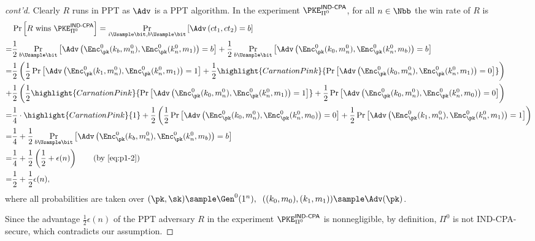 \begin{answer}
\begin{proof}[cont'd]
        Clearly $R$ runs in PPT as $\Adv$ is a PPT algorithm. In the experiment $\PKE^{\textsf{IND-CPA}}_{\Pi^0}$, for all $n\in\Nbb$ the win rate of $R$ is
        \begin{align*}
            &\Pr\left[R \textrm{ wins } \PKE^{\textsf{IND-CPA}}_{\Pi^0}\right]
            = \Pr_{i\Usample\bit, b\Usample\bit}\left[\Adv\left(ct_1, ct_2\right) = b\right]\\
            =&\frac{1}{2}\Pr_{b\Usample\bit}\left[\Adv\left(\Enc^0_\pk(k_b, m^0_n), \Enc^0_\pk(k^0_n, m_1) \right) = b\right] + \frac{1}{2} \Pr_{b\Usample\bit}\left[\Adv\left(\Enc^0_\pk(k_0, m^0_n), \Enc^0_\pk(k^0_n, m_b) \right) = b\right]\\
            =&\frac{1}{2}\left(\frac{1}{2} \Pr\left[\Adv\left(\Enc^0_\pk(k_1, m^0_n), \Enc^0_\pk(k^0_n, m_1) \right) = 1\right] 
            + \frac{1}{2} \highlight{CarnationPink}{\Pr\left[\Adv\left(\Enc^0_\pk(k_0, m^0_n), \Enc^0_\pk(k^0_n, m_1) \right) = 0\right]} \right)\\
            +& \frac{1}{2}\left(\frac{1}{2} \highlight{CarnationPink}{\Pr\left[\Adv\left(\Enc^0_\pk(k_0, m^0_n), \Enc^0_\pk(k^0_n, m_1) \right) = 1\right]}
            +\frac{1}{2} \Pr\left[\Adv\left(\Enc^0_\pk(k_0, m^0_n), \Enc^0_\pk(k^0_n, m_0) \right) = 0\right]\right)\\
            =& \frac{1}{4}\cdot \highlight{CarnationPink}{1}+\frac{1}{2}\left(\frac{1}{2}\Pr\left[\Adv\left(\Enc^0_\pk(k_0, m^0_n), \Enc^0_\pk(k^0_n, m_0) \right) = 0\right]+\frac{1}{2}\Pr\left[\Adv\left(\Enc^0_\pk(k_1, m^0_n), \Enc^0_\pk(k^0_n, m_1) \right) = 1\right]\right)\\
            =& \frac{1}{4}+\frac{1}{2}\Pr_{b\Usample\bit}\left[\Adv\left(\Enc^0_\pk(k_b, m^0_n), \Enc^0_\pk(k^0_n, m_b) \right) = b\right]\\
            =& \frac{1}{4}+\frac{1}{2}\left(\frac{1}{2}+\epsilon(n)\right) \qquad \textrm{(by \eqref{eq:p1-2})}\\
            =&\frac{1}{2}+\frac{1}{2}\epsilon(n),
        \end{align*}
        where all probabilities are taken over $(\pk, \sk)\sample\Gen^0(1^n),\;\; ((k_0, m_0), (k_1, m_1))\sample \Adv(\pk)$. 
        
        Since the advantage $\frac{1}{2}\epsilon(n)$ of the PPT adversary $R$ in the experiment $\PKE^{\textsf{IND-CPA}}_{\Pi^0}$ is nonnegligible, by definition,  $\Pi^0$ is not IND-CPA-secure, which contradicts our assumption.
    \end{proof}


\end{answer}
